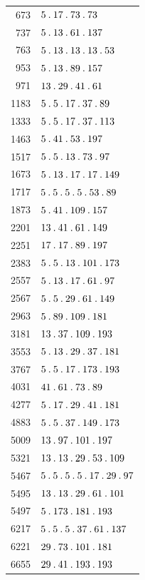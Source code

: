 \begin{longtable}{@{}r|l@{}}
673 & $5\mathbin{.} 17\mathbin{.} 73\mathbin{.} 73$\\
737 & $5\mathbin{.} 13\mathbin{.} 61\mathbin{.} 137$\\
763 & $5\mathbin{.} 13\mathbin{.} 13\mathbin{.} 13\mathbin{.} 53$\\
953 & $5\mathbin{.} 13\mathbin{.} 89\mathbin{.} 157$\\
971 & $13\mathbin{.} 29\mathbin{.} 41\mathbin{.} 61$\\
1183 & $5\mathbin{.} 5\mathbin{.} 17\mathbin{.} 37\mathbin{.} 89$\\
1333 & $5\mathbin{.} 5\mathbin{.} 17\mathbin{.} 37\mathbin{.} 113$\\
1463 & $5\mathbin{.} 41\mathbin{.} 53\mathbin{.} 197$\\
1517 & $5\mathbin{.} 5\mathbin{.} 13\mathbin{.} 73\mathbin{.} 97$\\
1673 & $5\mathbin{.} 13\mathbin{.} 17\mathbin{.} 17\mathbin{.} 149$\\
1717 & $5\mathbin{.} 5\mathbin{.} 5\mathbin{.} 5\mathbin{.} 53\mathbin{.} 89$\\
1873 & $5\mathbin{.} 41\mathbin{.} 109\mathbin{.} 157$\\
2201 & $13\mathbin{.} 41\mathbin{.} 61\mathbin{.} 149$\\
2251 & $17\mathbin{.} 17\mathbin{.} 89\mathbin{.} 197$\\
2383 & $5\mathbin{.} 5\mathbin{.} 13\mathbin{.} 101\mathbin{.} 173$\\
2557 & $5\mathbin{.} 13\mathbin{.} 17\mathbin{.} 61\mathbin{.} 97$\\
2567 & $5\mathbin{.} 5\mathbin{.} 29\mathbin{.} 61\mathbin{.} 149$\\
2963 & $5\mathbin{.} 89\mathbin{.} 109\mathbin{.} 181$\\
3181 & $13\mathbin{.} 37\mathbin{.} 109\mathbin{.} 193$\\
3553 & $5\mathbin{.} 13\mathbin{.} 29\mathbin{.} 37\mathbin{.} 181$\\
3767 & $5\mathbin{.} 5\mathbin{.} 17\mathbin{.} 173\mathbin{.} 193$\\
4031 & $41\mathbin{.} 61\mathbin{.} 73\mathbin{.} 89$\\
4277 & $5\mathbin{.} 17\mathbin{.} 29\mathbin{.} 41\mathbin{.} 181$\\
4883 & $5\mathbin{.} 5\mathbin{.} 37\mathbin{.} 149\mathbin{.} 173$\\
5009 & $13\mathbin{.} 97\mathbin{.} 101\mathbin{.} 197$\\
5321 & $13\mathbin{.} 13\mathbin{.} 29\mathbin{.} 53\mathbin{.} 109$\\
5467 & $5\mathbin{.} 5\mathbin{.} 5\mathbin{.} 5\mathbin{.} 17\mathbin{.} 29\mathbin{.} 97$\\
5495 & $13\mathbin{.} 13\mathbin{.} 29\mathbin{.} 61\mathbin{.} 101$\\
5497 & $5\mathbin{.} 173\mathbin{.} 181\mathbin{.} 193$\\
6217 & $5\mathbin{.} 5\mathbin{.} 5\mathbin{.} 37\mathbin{.} 61\mathbin{.} 137$\\
6221 & $29\mathbin{.} 73\mathbin{.} 101\mathbin{.} 181$\\
6655 & $29\mathbin{.} 41\mathbin{.} 193\mathbin{.} 193$\\

\end{longtable}
